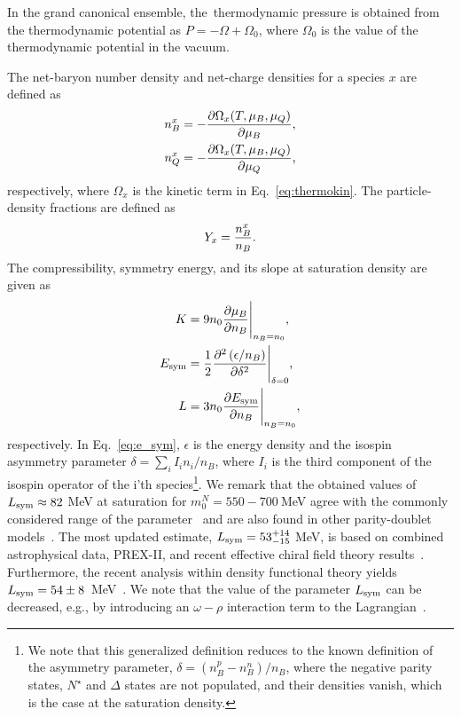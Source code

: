 \documentclass[preprint,showkeys,lengthcheck,nofootinbib,twocolumn,notitlepage,floatfix,superscriptaddress]{revtex4-1}
\begin{document}
In the grand canonical ensemble, the~thermodynamic pressure is obtained from the thermodynamic potential as \mbox{$P = -\Omega + \Omega_0$}, where $\Omega_0$ is the value of the thermodynamic potential in the vacuum.

The net-baryon number density and net-charge densities for a species $x$ are defined as
\begin{subequations}
\begin{align}
  n^x_B &= -\frac{\partial \Omega_x(T, \mu_B, \mu_Q)}{\partial \mu_B} \textrm,\\
  n^x_Q &= -\frac{\partial \Omega_x(T, \mu_B, \mu_Q)}{\partial \mu_Q} \textrm,
\end{align}
\end{subequations}
respectively, where $\Omega_x$ is the kinetic term in Eq.~\eqref{eq:thermokin}. The particle-density fractions are defined as
\begin{equation}\label{eq:fractions}
  Y_x = \frac{n_B^x}{n_B} \textrm.
\end{equation}
The compressibility, symmetry energy, and its slope at saturation density are given as
\begin{subequations}
\begin{align}
	K &= 9n_0 \frac{\partial \mu_B}{\partial n_B}\Bigg|_{n_B=n_0}\textrm,\\
	E_{\rm sym} &= \frac{1}{2}\frac{\partial^2 \left(\epsilon / n_B \right)}{\partial \delta^2}\Bigg|_{\delta = 0} \textrm,\label{eq:e_sym}\\
  L &= 3 n_0 \frac{\partial E_{\rm sym}}{\partial n_B} \Bigg|_{n_B = n_0}\textrm,
 \end{align}
\end{subequations}
respectively. In Eq.~\eqref{eq:e_sym}, $\epsilon$ is the energy density and the isospin asymmetry parameter $\delta = \sum_i I_i n_i / n_B$, where $I_i$ is the third component of the isospin operator of the i'th species\footnote{We note that this generalized definition reduces to the known definition of the asymmetry parameter, \mbox{$\delta = (n_B^p - n_B^n) / n_B$}, where the negative parity states, $N^\star$ and $\Delta$ states are not populated, and their densities vanish, which is the case at the saturation density.}. We remark that the obtained values of $L_{\rm sym}\approx82~$MeV at saturation for $m_0^N = 550-700~$MeV agree with the commonly considered range of the parameter~\citep{Oertel:2016bki} and are also found in other parity-doublet models~\citep{Motohiro:2015taa}. The most updated estimate, $L_{\rm sym} = 53^{+14}_{-15}~$MeV, is based on combined astrophysical data, PREX-II, and recent effective chiral field theory results~\citep{Essick:2021kjb}. Furthermore, the recent analysis within density functional theory yields $L_{\rm sym} = 54\pm8$~MeV~\citep{Reinhard:2021utv}. We note that the value of the parameter $L_{\rm sym}$ can be decreased, e.g., by introducing an $\omega-\rho$ interaction term to the Lagrangian~\cite{Dexheimer:2018dhb}.
\end{document}
